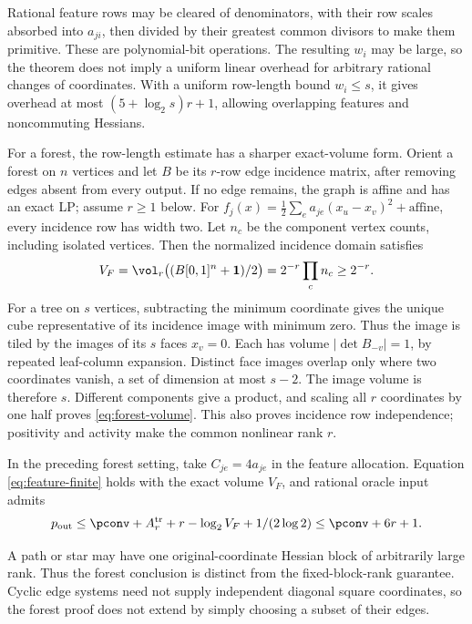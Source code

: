 Rational feature rows may be cleared of denominators, with their row
scales absorbed into $a_{ji}$, then divided by their greatest common
divisors to make them primitive. These are polynomial-bit operations.
The resulting $w_i$ may be large, so the theorem does not imply a
uniform linear overhead for arbitrary rational changes of coordinates.
With a uniform row-length bound $w_i\le s$, it gives overhead at most
$(5+\log_2s)r+1$, allowing overlapping features and noncommuting Hessians.

For a forest, the row-length estimate has a sharper exact-volume form.
Orient a forest on $n$ vertices and let $B$ be its $r$-row edge incidence
matrix, after removing edges absent from every output. If no edge remains,
the graph is affine and has an exact LP; assume $r\ge1$ below. For
$f_j(x)=\frac12\sum_ea_{je}(x_u-x_v)^2+\text{affine}$, every incidence
row has width two. Let $n_c$ be the component vertex counts, including
isolated vertices. Then the normalized incidence domain satisfies
\begin{equation}\label{eq:forest-volume}
 V_F=\vol_r\bigl((B[0,1]^n+\mathbf1)/2\bigr)
                    =2^{-r}\prod_cn_c\ge2^{-r}.
\end{equation}
For a tree on $s$ vertices, subtracting the minimum coordinate gives
the unique cube representative of its incidence image with minimum zero.
Thus the image is tiled by the images of its $s$ faces $x_v=0$.
Each has volume $|\det B_{-v}|=1$, by repeated leaf-column expansion.
Distinct face images overlap only where two coordinates vanish, a set
of dimension at most $s-2$. The image volume is therefore $s$.
Different components give a product, and scaling all $r$ coordinates
by one half proves \eqref{eq:forest-volume}. This also proves incidence
row independence; positivity and activity make the common nonlinear
rank $r$.

\begin{corollary}\label{cor:forest-precision}
In the preceding forest setting, take $C_{je}=4a_{je}$ in the feature
allocation. Equation \eqref{eq:feature-finite} holds with the exact
volume $V_F$, and rational oracle input admits
\[
 p_{\rm out}\le\pconv+A_r^{\rm tr}+r-\log_2V_F+1/(2\log2)
                      \le\pconv+6r+1.
\]
\end{corollary}
A path or star may have one original-coordinate Hessian block of
arbitrarily large rank. Thus the forest conclusion is distinct from
the fixed-block-rank guarantee. Cyclic edge systems need not supply
independent diagonal square coordinates, so the forest proof does not
extend by simply choosing a subset of their edges.

